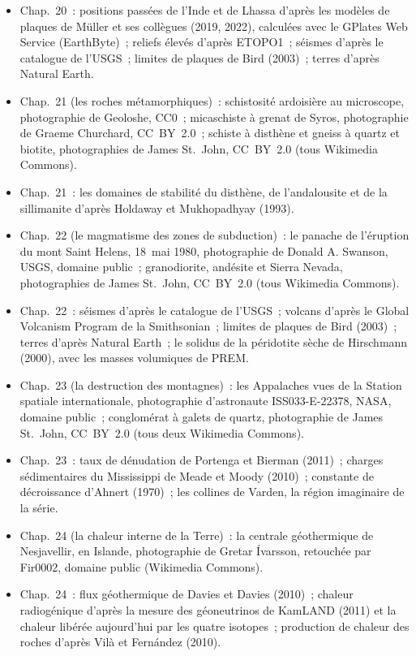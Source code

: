 \begin{itemize}
  \item Chap.~20~: positions passées de l'Inde et de Lhassa d'après les modèles de plaques de Müller et ses collègues (2019, 2022), calculées avec le GPlates Web Service (EarthByte)~; reliefs élevés d'après ETOPO1~; séismes d'après le catalogue de l'USGS~; limites de plaques de Bird (2003)~; terres d'après Natural Earth.
  \item Chap.~21 (les roches métamorphiques)~: schistosité ardoisière au microscope, photographie de Geoloshe, CC0~; micaschiste à grenat de Syros, photographie de Graeme Churchard, CC~BY~2.0~; schiste à disthène et gneiss à quartz et biotite, photographies de James St.~John, CC~BY~2.0 (tous Wikimedia Commons).
  \item Chap.~21~: les domaines de stabilité du disthène, de l'andalousite et de la sillimanite d'après Holdaway et Mukhopadhyay (1993).
  \item Chap.~22 (le magmatisme des zones de subduction)~: le panache de l'éruption du mont Saint Helens, 18~mai 1980, photographie de Donald A. Swanson, USGS, domaine public~; granodiorite, andésite et Sierra Nevada, photographies de James St.~John, CC~BY~2.0 (tous Wikimedia Commons).
  \item Chap.~22~: séismes d'après le catalogue de l'USGS~; volcans d'après le Global Volcanism Program de la Smithsonian~; limites de plaques de Bird (2003)~; terres d'après Natural Earth~; le solidus de la péridotite sèche de Hirschmann (2000), avec les masses volumiques de PREM.
  \item Chap.~23 (la destruction des montagnes)~: les Appalaches vues de la Station spatiale internationale, photographie d'astronaute ISS033-E-22378, NASA, domaine public~; conglomérat à galets de quartz, photographie de James St.~John, CC~BY~2.0 (tous deux Wikimedia Commons).
  \item Chap.~23~: taux de dénudation de Portenga et Bierman (2011)~; charges sédimentaires du Mississippi de Meade et Moody (2010)~; constante de décroissance d'Ahnert (1970)~; les collines de Varden, la région imaginaire de la série.
  \item Chap.~24 (la chaleur interne de la Terre)~: la centrale géothermique de Nesjavellir, en Islande, photographie de Gretar Ívarsson, retouchée par Fir0002, domaine public (Wikimedia Commons).
  \item Chap.~24~: flux géothermique de Davies et Davies (2010)~; chaleur radiogénique d'après la mesure des géoneutrinos de KamLAND (2011) et la chaleur libérée aujourd'hui par les quatre isotopes~; production de chaleur des roches d'après Vilà et Fernández (2010).

\end{itemize}
